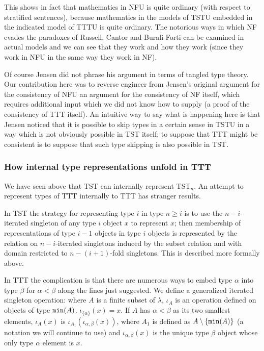 \documentclass[112pt]{article}
\begin{document}
\begin{description}
This shows in fact that mathematics in NFU is quite ordinary (with respect to stratified sentences), because mathematics in the models of TSTU embedded in the indicated model of TTTU is quite ordinary.  The notorious ways in which NF evades the paradoxes of Russell, Cantor and Burali-Forti can be examined in actual models and we can see that they work and how they work (since they work in NFU in the same way they work in NF).

\end{description}

Of course Jensen did not phrase his argument in terms of tangled type theory.  Our contribution here was to reverse engineer from Jensen's original argument for the consistency of NFU an argument for the consistency of NF itself, which requires additional input which we did not know how to supply (a proof of the consistency of TTT itself).  An intuitive way to say what is happening here is that Jensen noticed that it is possible to skip types in a certain sense in TSTU in a way which is not obviously possible in TST itself;  to suppose that TTT might be consistent is to suppose that such type skipping is also possible in TST.

\newpage



\subsubsection{How internal type representations unfold in TTT}

We have seen above that TST can internally represent TST$_n$.   An attempt to represent types of TTT internally to TTT has stranger results.

In TST the strategy for representing type $i$ in type $n\geq i$  is to use the $n-i$-iterated singleton of any type $i$ object $x$ to represent $x$;  then membership of representations of type $i-1$ objects in type
$i$ objects is represented by the relation on $n-i$-iterated singletons induced by the subset relation and with domain restricted to $n-(i+1)$-fold singletons.  This is described more formally above.

In TTT the complication is that there are numerous ways to embed type $\alpha$ into type $\beta$ for $\alpha<\beta$ along the lines just suggested.    We define a generalized
iterated singleton operation:  where $A$ is a finite subset of $\lambda$, $\iota_A$ is an operation defined on objects of type ${\tt min}(A)$.  $\iota_{\{\alpha\}}(x)=x$.
If $A$ has $\alpha<\beta$ as its two smallest elements, $\iota_A(x)$ is  $\iota_{A_1}(\iota_{\alpha,\beta}(x))$, where $A_1$ is defined as $A \setminus \{{\tt min}(A)\}$ (a notation we will continue to use) and $\iota_{\alpha,\beta}(x)$ is the unique type $\beta$ object whose only type $\alpha$ element is $x$.
\end{document}
